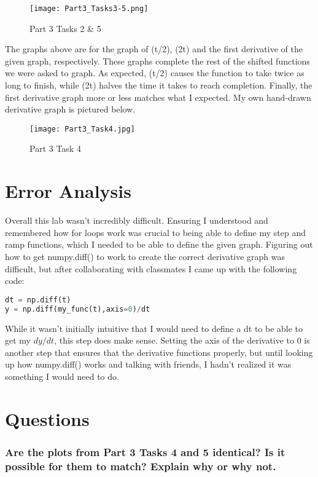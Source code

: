 \documentclass[12pt]{report}
\begin{document}
\begin{figure}[H]
    \centering
    \texttt{[image: Part3\_Tasks3-5.png]}
    \caption{Part 3 Tasks 2 \& 5}
    \label{fig:3}
\end{figure}

The graphs above are for the graph of (t/2), (2t) and the first derivative of the given graph, respectively. These graphs complete the rest of the shifted functions we were asked to graph. As expected, (t/2) causes the function to take twice as long to finish, while (2t) halves the time it takes to reach completion. Finally, the first derivative graph more or less matches what I expected. My own hand-drawn derivative graph is pictured below.

\begin{figure}[H]
    \centering
    \texttt{[image: Part3\_Task4.jpg]}
    \caption{Part 3 Task 4}
\end{figure}

 
 \section{Error Analysis}
 
 Overall this lab wasn't incredibly difficult. Ensuring I understood and remembered how for loops work was crucial to being able to define my step and ramp functions, which I needed to be able to define the given graph. Figuring out how to get numpy.diff() to work to create the correct derivative graph was difficult, but after collaborating with classmates I came up with the following code:
 \begin{lstlisting}[language=Python]
dt = np.diff(t)
y = np.diff(my_func(t),axis=0)/dt
\end{lstlisting}
While it wasn't initially intuitive that I would need to define a dt to be able to get my $dy/dt$, this step does make sense. Setting the axis of the derivative to 0 is another step that ensures that the derivative functions properly, but until looking up how numpy.diff() works and talking with friends, I hadn't realized it was something I would need to do. 
 
 \section{Questions}
 \subsubsection{Are the plots from Part 3 Tasks 4 and 5 identical? Is it possible for them to match? Explain why or why not.}
 
\end{document}
